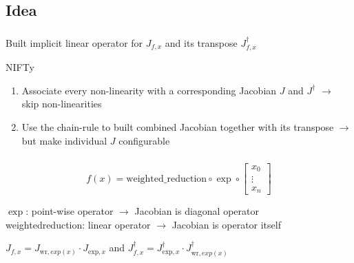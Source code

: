 \documentclass[aspectratio=169,xcolor=dvipsnames]{beamer}
\begin{document}
\subsection{Idea}
\begin{frame}
	\frametitle{\insertsection}
	\framesubtitle{\insertsubsection}

	Built implicit linear operator for $J_{f,x}$ and its transpose $J_{f,x}^\dagger$

	\vspace{3em}
	NIFTy
	\begin{enumerate}
		\item Associate every non-linearity with a corresponding Jacobian $J$ and $J^\dagger$ $\rightarrow$ skip non-linearities
		\item Use the chain-rule to built combined Jacobian together with its transpose $\rightarrow$ but make individual $J$ configurable
	\end{enumerate}

\end{frame}

\begin{frame}
	\frametitle{\insertsection}
	\framesubtitle{\insertsubsection}

	\begin{equation*}
		f(x) =
		\text{weighted\_reduction}
		\circ
		\exp
		\circ
		\begin{bmatrix}
			x_{0} \\
			\vdots \\
			x_{n}
		\end{bmatrix}
	\end{equation*}

	\vspace{1em}
	$\exp$: point-wise operator $\rightarrow$ Jacobian is diagonal operator
	\\ weighted\textunderscore{}reduction: linear operator $\rightarrow$ Jacobian is operator itself

	\vspace{2em}
	\begin{center}
		$J_{f,x} = J_{\text{wr},exp(x)} \cdot J_{\text{exp},x}$
		\hspace{2em}
		and
		\hspace{2em}
		$J_{f,x}^\dagger = J_{\text{exp},x}^\dagger \cdot J_{\text{wr},exp(x)}^\dagger$
	\end{center}

\end{frame}
\end{document}
